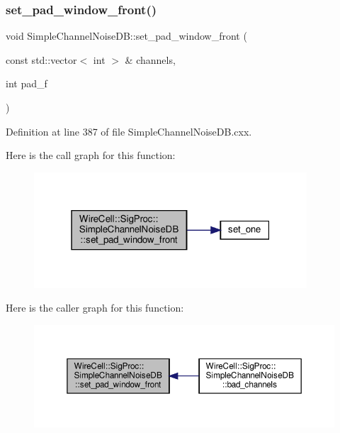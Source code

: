 \subsubsection{\texorpdfstring{set\+\_\+pad\+\_\+window\+\_\+front()}{set\_pad\_window\_front()}}
{\footnotesize\ttfamily void Simple\+Channel\+Noise\+D\+B\+::set\+\_\+pad\+\_\+window\+\_\+front (\begin{DoxyParamCaption}\item[{const std\+::vector$<$ int $>$ \&}]{channels,  }\item[{int}]{pad\+\_\+f }\end{DoxyParamCaption})}



Definition at line 387 of file Simple\+Channel\+Noise\+D\+B.\+cxx.

Here is the call graph for this function\+:
\nopagebreak
\begin{figure}[H]
\begin{center}
\leavevmode
\includegraphics[width=289pt]{class_wire_cell_1_1_sig_proc_1_1_simple_channel_noise_d_b_aeb80b3766efb4756055bbe016cd58e2c_cgraph}
\end{center}
\end{figure}
Here is the caller graph for this function\+:
\nopagebreak
\begin{figure}[H]
\begin{center}
\leavevmode
\includegraphics[width=350pt]{class_wire_cell_1_1_sig_proc_1_1_simple_channel_noise_d_b_aeb80b3766efb4756055bbe016cd58e2c_icgraph}
\end{center}
\end{figure}
\mbox{\label{class_wire_cell_1_1_sig_proc_1_1_simple_channel_noise_d_b_a1c4c378e91ff2ead5aff08bc3615b1d2}} 
